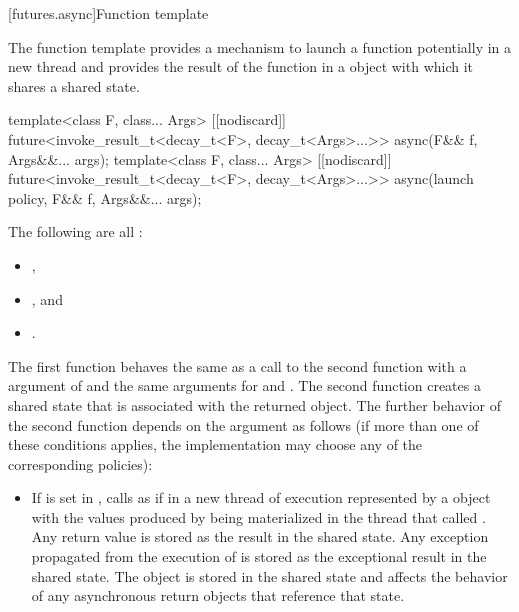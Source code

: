 [futures.async]{Function template }

\pnum
The function template  provides a mechanism to launch a function potentially
in a new thread and provides the result of the function in a  object with which
it shares a shared state.

%
\begin{itemdecl}
template<class F, class... Args>
  [[nodiscard]] future<invoke_result_t<decay_t<F>, decay_t<Args>...>>
    async(F&& f, Args&&... args);
template<class F, class... Args>
  [[nodiscard]] future<invoke_result_t<decay_t<F>, decay_t<Args>...>>
    async(launch policy, F&& f, Args&&... args);
\end{itemdecl}

\begin{itemdescr}
\pnum
\mandates
The following are all :
\begin{itemize}
\item {},
\item {}, and
\item {}.
\end{itemize}

\pnum
\effects
The first function
behaves the same as a call to the second function with a  argument of
and the same arguments for  and .
The second function creates a shared state that is associated with
the returned  object.
The further behavior
of the second function depends on the  argument as follows (if
more than one of these conditions applies, the implementation may choose any of
the corresponding policies):

\begin{itemize}
\item
If  is set in , calls
as if in a new thread of execution represented by a  object
with the values produced by 
being materialized in the thread that called .
Any return value
is stored as the result in the
shared state. Any exception propagated from
the execution of
is stored as the exceptional result in the shared state.
The  object is
stored in the shared state
and affects the behavior of any asynchronous return objects that
reference that state.


\end{itemize}
\end{itemdescr}
